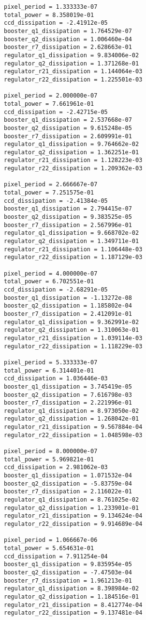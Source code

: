\documentclass[12pt]{report}
\begin{document}
\begin{verbatim}
pixel_period = 1.333333e-07
total_power = 8.358019e-01
ccd_dissipation = -2.41912e-05
booster_q1_dissipation = 1.764529e-07
booster_q2_dissipation = 1.006460e-04
booster_r7_dissipation = 2.628663e-01
regulator_q1_dissipation = 9.834006e-02
regulator_q2_dissipation = 1.371268e-01
regulator_r21_dissipation = 1.144064e-03
regulator_r22_dissipation = 1.225501e-03
 
pixel_period = 2.000000e-07
total_power = 7.661961e-01
ccd_dissipation = -2.42715e-05
booster_q1_dissipation = 2.537668e-07
booster_q2_dissipation = 9.615248e-05
booster_r7_dissipation = 2.609991e-01
regulator_q1_dissipation = 9.764662e-02
regulator_q2_dissipation = 1.362251e-01
regulator_r21_dissipation = 1.128223e-03
regulator_r22_dissipation = 1.209362e-03
 
pixel_period = 2.666667e-07
total_power = 7.251575e-01
ccd_dissipation = -2.41384e-05
booster_q1_dissipation = 2.794415e-07
booster_q2_dissipation = 9.383525e-05
booster_r7_dissipation = 2.567996e-01
regulator_q1_dissipation = 9.668702e-02
regulator_q2_dissipation = 1.349711e-01
regulator_r21_dissipation = 1.106448e-03
regulator_r22_dissipation = 1.187129e-03
 
pixel_period = 4.000000e-07
total_power = 6.702551e-01
ccd_dissipation = -2.68291e-05
booster_q1_dissipation = -1.13272e-08
booster_q2_dissipation = 1.185802e-04
booster_r7_dissipation = 2.412091e-01
regulator_q1_dissipation = 9.362991e-02
regulator_q2_dissipation = 1.310063e-01
regulator_r21_dissipation = 1.039114e-03
regulator_r22_dissipation = 1.118229e-03
 
pixel_period = 5.333333e-07
total_power = 6.314401e-01
ccd_dissipation = 1.036446e-03
booster_q1_dissipation = 3.745419e-05
booster_q2_dissipation = 7.616798e-03
booster_r7_dissipation = 2.221996e-01
regulator_q1_dissipation = 8.973050e-02
regulator_q2_dissipation = 1.268042e-01
regulator_r21_dissipation = 9.567884e-04
regulator_r22_dissipation = 1.048598e-03
 
pixel_period = 8.000000e-07
total_power = 5.969821e-01
ccd_dissipation = 2.981062e-03
booster_q1_dissipation = 1.071532e-04
booster_q2_dissipation = -5.83759e-04
booster_r7_dissipation = 2.116022e-01
regulator_q1_dissipation = 8.761025e-02
regulator_q2_dissipation = 1.233901e-01
regulator_r21_dissipation = 9.134624e-04
regulator_r22_dissipation = 9.914689e-04
 
pixel_period = 1.066667e-06
total_power = 5.654631e-01
ccd_dissipation = 7.911254e-04
booster_q1_dissipation = 9.835954e-05
booster_q2_dissipation = -7.47503e-04
booster_r7_dissipation = 1.961213e-01
regulator_q1_dissipation = 8.398984e-02
regulator_q2_dissipation = 1.184516e-01
regulator_r21_dissipation = 8.412774e-04
regulator_r22_dissipation = 9.137481e-04
 

\end{verbatim}
\end{document}
